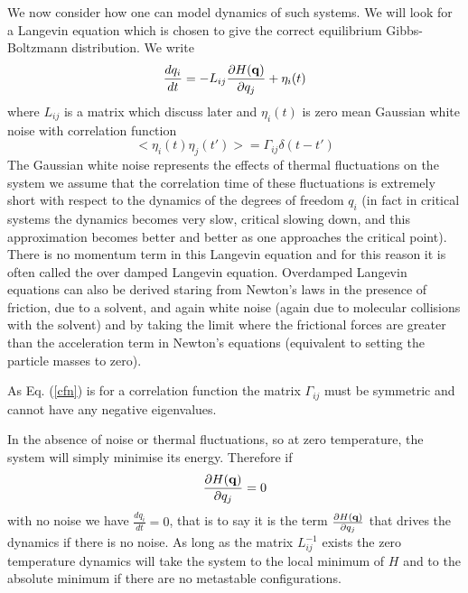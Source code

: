 We now consider how one can model dynamics of such systems. We will look for a Langevin equation which is chosen to give the correct equilibrium Gibbs-Boltzmann distribution. We write
\begin{equation}
    \frac{d q_i}{dt} = -L_{ij}\frac{\partial H({\bf q})}{ \partial q_j} + \eta_i(t)
\end{equation}
where $L_{ij}$ is a matrix which discuss later and $\eta_i(t)$ is zero mean Gaussian white noise  with correlation function 
\begin{equation}
    < \eta_i(t)\eta_j(t')> =  \Gamma_{ij} \delta(t-t')
    \label{cfn}
\end{equation}
The Gaussian white noise represents the effects of thermal fluctuations on the system we assume that the correlation time of these fluctuations is extremely short with respect to the dynamics of the degrees of freedom $q_i$ (in fact in critical systems the dynamics becomes very slow, critical slowing down, and this approximation becomes better and better as one approaches the critical point).  There is no momentum term in this Langevin equation and for this reason it is often called the over damped Langevin equation. Overdamped Langevin equations can also be derived staring from Newton's laws in the presence of friction, due to a solvent, and again white noise (again due to molecular collisions with the solvent) and by taking the limit where the frictional forces are greater than the acceleration term in Newton's equations (equivalent to setting the particle masses to zero).


As Eq. (\ref{cfn}) is for a correlation function the matrix $\Gamma_{ij}$ must be symmetric and cannot have any negative eigenvalues.

In the absence of noise or thermal fluctuations, so at zero temperature, the system will simply minimise its energy. Therefore if 
\begin{equation}
    \frac{\partial H({\bf q})}{ \partial q_j} =0
\end{equation}
with no noise we have $\frac{d q_i}{dt}=0$, that is to say it is the term $\frac{\partial H({\bf q})}{ \partial q_j}$ that drives the dynamics if there is no noise. As long as the matrix $L_{ij}^{-1}$ exists the zero temperature dynamics will take the system to the local minimum of $H$ and to the absolute minimum if there are no metastable configurations. 

